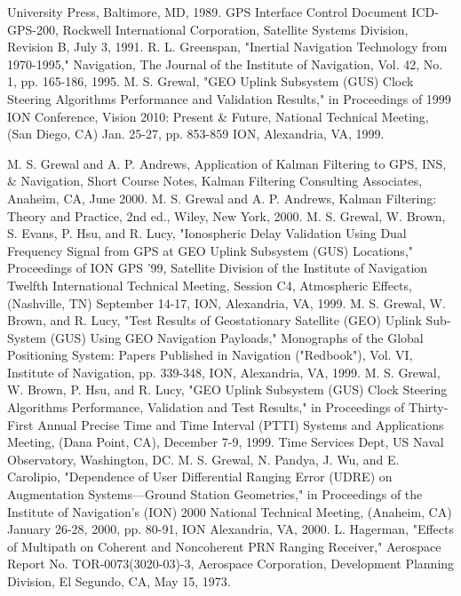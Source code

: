 \begin{thebibliography}{99}
University Press, Baltimore, MD, 1989.
 GPS Interface Control Document ICD-GPS-200, Rockwell International Corporation,
Satellite Systems Division, Revision B, July 3, 1991.
 R. L. Greenspan, "Inertial Navigation Technology from 1970-1995," Navigation, The
Journal of the Institute of Navigation, Vol. 42, No. 1, pp. 165-186, 1995.
 M. S. Grewal, "GEO Uplink Subsystem (GUS) Clock Steering Algorithms Performance
and Validation Results," in Proceedings of 1999 ION Conference, Vision 2010: Present \&
Future, National Technical Meeting, (San Diego, CA) Jan. 25-27, pp. 853-859 ION,
Alexandria, VA, 1999.
 

 M. S. Grewal and A. P. Andrews, Application of Kalman Filtering to GPS, INS, \&
Navigation, Short Course Notes, Kalman Filtering Consulting Associates, Anaheim, CA,
June 2000.
 M. S. Grewal and A. P. Andrews, Kalman Filtering: Theory and Practice, 2nd ed., Wiley,
New York, 2000.
 M. S. Grewal, W. Brown, S. Evans, P. Hsu, and R. Lucy, "Ionospheric Delay Validation
Using Dual Frequency Signal from GPS at GEO Uplink Subsystem (GUS) Locations,"
Proceedings of ION GPS '99, Satellite Division of the Institute of Navigation Twelfth
International Technical Meeting, Session C4, Atmospheric Effects, (Nashville, TN)
September 14-17, ION, Alexandria, VA, 1999.
 M. S. Grewal, W. Brown, and R. Lucy, "Test Results of Geostationary Satellite (GEO)
Uplink Sub-System (GUS) Using GEO Navigation Payloads," Monographs of the Global
Positioning System: Papers Published in Navigation ("Redbook"), Vol. VI, Institute of
Navigation, pp. 339-348, ION, Alexandria, VA, 1999.
 M. S. Grewal, W. Brown, P. Hsu, and R. Lucy, "GEO Uplink Subsystem (GUS) Clock
Steering Algorithms Performance, Validation and Test Results," in Proceedings of Thirty-
First Annual Precise Time and Time Interval (PTTI) Systems and Applications Meeting,
(Dana Point, CA), December 7-9, 1999. Time Services Dept, US Naval Observatory,
Washington, DC.
 M. S. Grewal, N. Pandya, J. Wu, and E. Carolipio, "Dependence of User Differential
Ranging Error (UDRE) on Augmentation Systems—Ground Station Geometries," in
Proceedings of the Institute of Navigation's (ION) 2000 National Technical Meeting,
(Anaheim, CA) January 26-28, 2000, pp. 80-91, ION Alexandria, VA, 2000.
 L. Hagerman,  "Effects of Multipath on Coherent and Noncoherent PRN Ranging
Receiver,"   Aerospace  Report  No.   TOR-0073(3020-03)-3,   Aerospace   Corporation,
Development Planning Division, El Segundo, CA, May 15, 1973.

\end{thebibliography}
